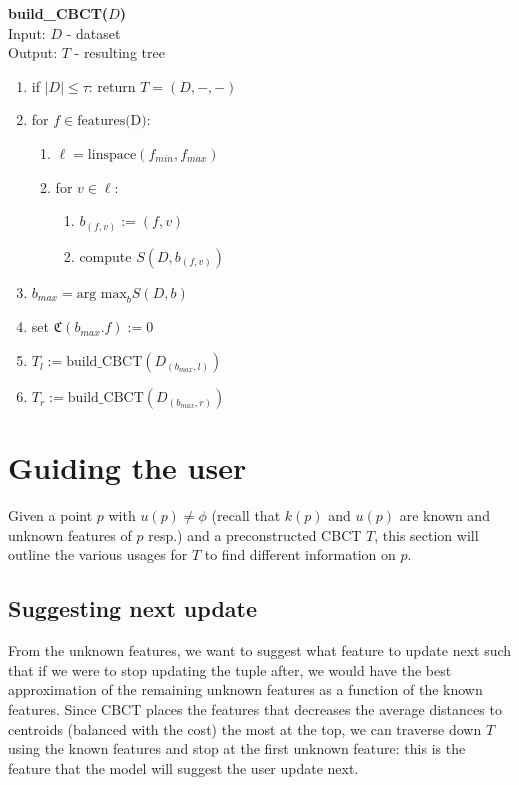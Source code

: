 \documentclass[conference]{IEEEtran}
\begin{document}
\begin{algorithm} 
   \textbf{build\_CBCT($D$)}\\
	Input: $D$ - dataset\\
	Output: $T$ - resulting tree 
	\begin{enumerate}
		\item if $|D| \le \tau$: return $T = (D,-,-)$
		\item for $f \in \text{features(D)}$:
		\begin{enumerate}
			\item $\ell = \text{linspace}(f_{min}, f_{max})$
			\item for $v \in \ell$:
			\begin{enumerate}
				\item $b_{(f,v)} := (f,v)$
				\item compute $S(D, b_{(f,v)})$
			\end{enumerate}
		\end{enumerate}
		\item $b_{max} = \text{arg max}_b S(D,b)$
		\item set $\mathfrak{C}(b_{max}.f) := 0$
		\item $T_{l} := \text{build\_CBCT}(D_{(b_{max}, l)})$
		\item $T_{r} := \text{build\_CBCT}(D_{(b_{max}, r)})$
	\end{enumerate}
\end{algorithm}

\section{Guiding the user}
Given a point $p$ with $u(p) \ne \phi$ (recall that $k(p)$ and $u(p)$ are
known and unknown features of $p$ resp.) and a preconstructed CBCT
$T$, this section will outline the various usages for $T$ to find different
information on $p$. 

\subsection{Suggesting next update}
From the unknown features, we want to suggest what feature to update
next such that if we were to stop updating the tuple after, we would have the
best approximation of the remaining unknown features as a function of
the known features. Since CBCT places the features that decreases the 
average distances to centroids (balanced with the cost) 
the most at the top, we can traverse
down $T$ using the known features and stop at the first unknown feature:
this is the feature that the model will suggest the user update next.
\end{document}

